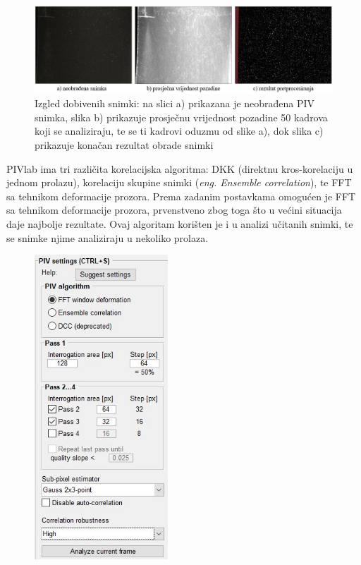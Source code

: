 \begin{description}[style=unboxed,leftmargin=0cm]
\begin{figure}[h]
		\label{sl:7.5}
	\end{figure}
	\begin{figure}[h]  
		\centering
		\includegraphics[width=16.5cm]{./7_LowCostPIV/slika7_6.jpg} 
		\caption{Izgled dobivenih snimki: na slici a) prikazana je neobrađena PIV snimka, slika b) prikazuje prosječnu vrijednost pozadine 50 kadrova koji se analiziraju, te se ti kadrovi oduzmu od slike a), dok slika c) prikazuje konačan rezultat obrade snimki}
		\label{sl:7.6}
	\end{figure}
	\item[Opcije PIV analize] PIVlab ima tri različita korelacijska algoritma: DKK (direktnu kros-korelaciju u jednom prolazu), korelaciju skupine snimki (\textit{eng. Ensemble correlation}), te FFT sa tehnikom deformacije prozora. Prema zadanim postavkama omogućen je FFT sa tehnikom deformacije prozora, prvenstveno zbog toga što u većini situacija daje najbolje rezultate. Ovaj algoritam korišten je i u analizi učitanih snimki, te se snimke njime analiziraju u nekoliko prolaza. 
	\begin{figure}[h]  
		\centering
		\includegraphics[width=5cm]{./7_LowCostPIV/slika7_7.jpg} 

\end{figure}
\end{description}

